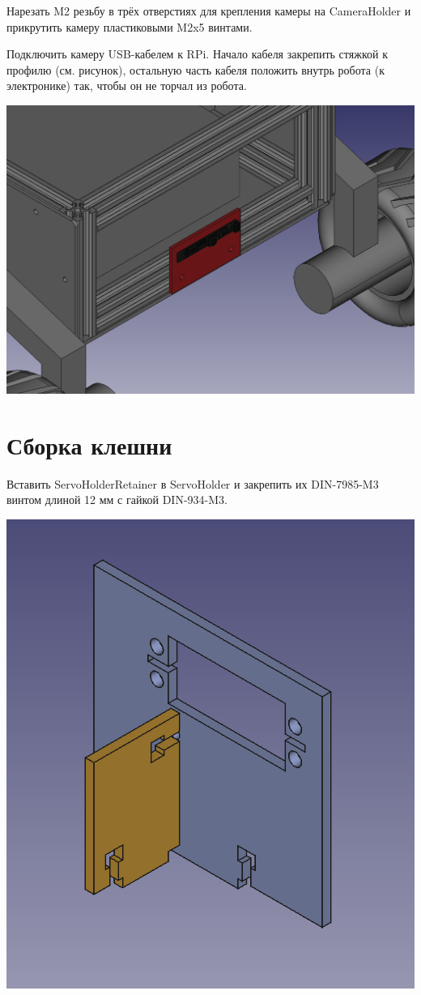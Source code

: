 \documentclass[12pt,a4paper,oneside]{article}
\begin{document}
Нарезать M2 резьбу в трёх отверстиях для крепления камеры на CameraHolder и
прикрутить камеру пластиковыми M2x5 винтами.

Подключить камеру USB-кабелем к RPi. Начало кабеля закрепить стяжкой к профилю
(см. рисунок), остальную часть кабеля положить внутрь робота (к электронике)
так, чтобы он не торчал из робота.

\includegraphics[width=\textwidth]{cameraholder}

\section{Сборка клешни}
Вставить ServoHolderRetainer в ServoHolder и закрепить их DIN-7985-M3 винтом
длиной 12 мм с гайкой DIN-934-M3.

\includegraphics[width=\textwidth]{servoholder}
\end{document}
